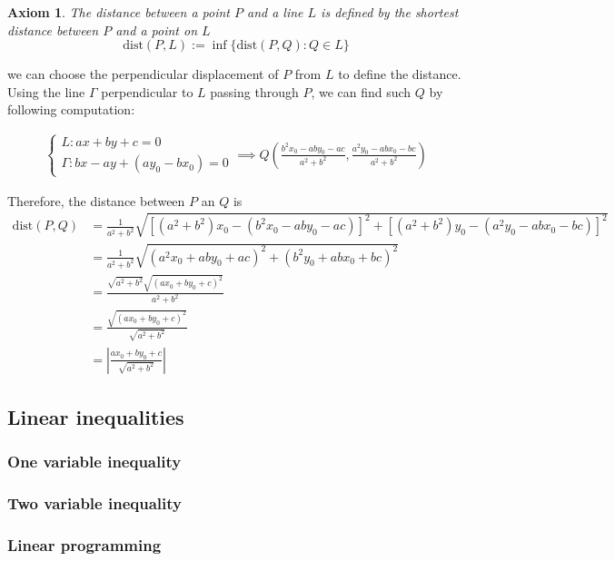 \documentclass[12pt]{article}
\newtheorem*{axiom}{Axiom}
\begin{document}
    \begin{axiom}
        The distance between a point $P$ and a line $L$ is defined by the shortest distance between $P$ and a point on $L$ $$\mathrm{dist}(P,L):=\inf\{\mathrm{dist}(P,Q):Q\in L\}$$
    \end{axiom}

    we can choose the perpendicular displacement of $P$ from $L$ to define the distance. Using the line $\Gamma$ perpendicular to $L$ passing through $P$, we can find such $Q$ by following computation:

    \begin{align*}
        \begin{cases}
            L:ax+by+c=0\\
            \Gamma:bx-ay+(ay_0-bx_0)=0
        \end{cases}\implies Q(\frac{b^2x_0-aby_0-ac}{a^2+b^2},\frac{a^2y_0-abx_0-bc}{a^2+b^2})
    \end{align*}

    Therefore, the distance between $P$ an $Q$ is \begin{align*}
        \mathrm{dist}(P,Q)&=\frac{1}{a^2+b^2}\sqrt{[(a^2+b^2)x_0-(b^2x_0-aby_0-ac)]^2+[(a^2+b^2)y_0-(a^2y_0-abx_0-bc)]^2}\\
        &=\frac{1}{a^2+b^2}\sqrt{(a^2x_0+aby_0+ac)^2+(b^2y_0+abx_0+bc)^2}\\
        &=\frac{\sqrt{a^2+b^2}\sqrt{(ax_0+by_0+c)^2}}{a^2+b^2}\\
        &=\frac{\sqrt{(ax_0+by_0+c)^2}}{\sqrt{a^2+b^2}}\\
        &=\left|\frac{ax_0+by_0+c}{\sqrt{a^2+b^2}}\right|
    \end{align*}

    \subsection{Linear inequalities}

    \subsubsection*{One variable inequality}

    \subsubsection*{Two variable inequality}

    \subsubsection*{Linear programming}
\end{document}
